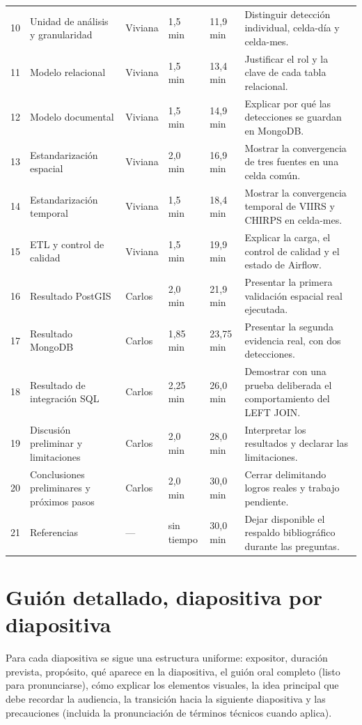 \documentclass[11pt,a4paper]{article}
\begin{document}
\begin{longtable}{@{}p{0.65cm}p{3.4cm}p{2.7cm}p{1.6cm}p{1.6cm}p{4.85cm}@{}}
10 & Unidad de an\'alisis y granularidad & Viviana & 1,5 min & 11,9 min & Distinguir detecci\'on individual, celda-d\'ia y celda-mes. \\
11 & Modelo relacional & Viviana & 1,5 min & 13,4 min & Justificar el rol y la clave de cada tabla relacional. \\
12 & Modelo documental & Viviana & 1,5 min & 14,9 min & Explicar por qu\'e las detecciones se guardan en MongoDB. \\
13 & Estandarizaci\'on espacial & Viviana & 2,0 min & 16,9 min & Mostrar la convergencia de tres fuentes en una celda com\'un. \\
14 & Estandarizaci\'on temporal & Viviana & 1,5 min & 18,4 min & Mostrar la convergencia temporal de VIIRS y CHIRPS en celda-mes. \\
15 & ETL y control de calidad & Viviana & 1,5 min & 19,9 min & Explicar la carga, el control de calidad y el estado de Airflow. \\
16 & Resultado PostGIS & Carlos & 2,0 min & 21,9 min & Presentar la primera validaci\'on espacial real ejecutada. \\
17 & Resultado MongoDB & Carlos & 1,85 min & 23,75 min & Presentar la segunda evidencia real, con dos detecciones. \\
18 & Resultado de integraci\'on SQL & Carlos & 2,25 min & 26,0 min & Demostrar con una prueba deliberada el comportamiento del LEFT JOIN. \\
19 & Discusi\'on preliminar y limitaciones & Carlos & 2,0 min & 28,0 min & Interpretar los resultados y declarar las limitaciones. \\
20 & Conclusiones preliminares y pr\'oximos pasos & Carlos & 2,0 min & 30,0 min & Cerrar delimitando logros reales y trabajo pendiente. \\
21 & Referencias & --- & sin tiempo & 30,0 min & Dejar disponible el respaldo bibliogr\'afico durante las preguntas. \\
\bottomrule
\end{longtable}

\newpage

\section{Gui\'on detallado, diapositiva por diapositiva}

Para cada diapositiva se sigue una estructura uniforme: expositor,
duraci\'on prevista, prop\'osito, qu\'e aparece en la diapositiva, el
gui\'on oral completo (listo para pronunciarse), c\'omo explicar los
elementos visuales, la idea principal que debe recordar la audiencia,
la transici\'on hacia la siguiente diapositiva y las precauciones
(incluida la pronunciaci\'on de t\'erminos t\'ecnicos cuando aplica).
\end{document}
